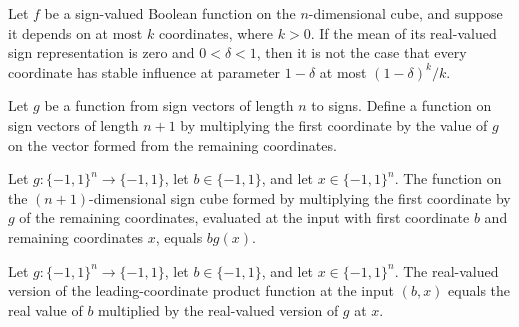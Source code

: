 \begin{theorem}
\label{FABL.not_hasSmallStableInfluences_of_isKJunta_of_balanced}
\leanok
{}
Let $f$ be a sign-valued Boolean function on the $n$-dimensional cube, and suppose it
depends on at most $k$ coordinates, where $k>0$. If the mean of its real-valued sign
representation is zero and $0<\delta<1$, then it is not the case that every coordinate
has stable influence at parameter $1-\delta$ at most $(1-\delta)^k/k$.
\end{theorem}

\begin{definition}
\label{FABL.leadingCoordinateTimes}
\leanok
{}
Let $g$ be a function from sign vectors of length $n$ to signs. Define a function on
sign vectors of length $n+1$ by multiplying the first coordinate by the value of $g$ on
the vector formed from the remaining coordinates.
\end{definition}

\begin{theorem}
\label{FABL.leadingCoordinateTimes_fin_cons}
\leanok
{}
Let $g:\{−1,1\}^n\to\{−1,1\}$, let $b\in\{−1,1\}$, and let $x\in\{−1,1\}^n$. The
function on the $(n+1)$-dimensional sign cube formed by multiplying the first coordinate
by $g$ of the remaining coordinates, evaluated at the input with first coordinate $b$
and remaining coordinates $x$, equals $b g(x)$.
\end{theorem}

\begin{theorem}
\label{FABL.leadingCoordinateTimes_toReal_fin_cons}
\leanok
{}
Let $g:\{−1,1\}^n\to\{−1,1\}$, let $b\in\{−1,1\}$, and let $x\in\{−1,1\}^n$. The
real-valued version of the leading-coordinate product function at the input $(b,x)$
equals the real value of $b$ multiplied by the real-valued version of $g$ at $x$.
\end{theorem}

